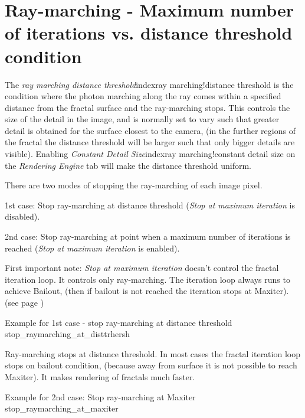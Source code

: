 \section{Ray-marching - Maximum number of iterations vs. distance threshold
	condition}\label{ray-marching---maximum-number-of-iterations-vs.-distance-threshold-condition}

The \emph{ray marching distance threshold}index{ray marching!distance threshold} is the condition where the photon
marching along the ray comes within a specified distance from the fractal
surface and the ray-marching stops. This controls the size of the detail in the
image, and is normally set to vary such that greater detail is obtained for the
surface closest to the camera, (in the further regions of the fractal the
distance threshold will be larger such that only bigger details are visible).
Enabling \emph{Constant Detail Size}index{ray marching!constant detail size} on the \emph{Rendering Engine} tab will
make the distance threshold uniform.

There are two modes of stopping the ray-marching of each image pixel.

1st case: Stop ray-marching at distance threshold (\emph{Stop at maximum
	iteration} is disabled).

2nd case: Stop ray-marching at point when a maximum number of iterations is
reached (\emph{Stop at maximum iteration} is enabled).

First important note: \emph{Stop at maximum iteration} doesn't control the
fractal iteration loop. It controls only ray-marching. The iteration loop always
runs to achieve Bailout, (then if bailout is not reached the iteration stops at
Maxiter). (see page \pageref{bailout-maxiter})

	{Example for 1st case - stop ray-marching at distance threshold}
	{stop_raymarching_at_disttrhersh}

Ray-marching stops at distance threshold. In most cases the fractal iteration
loop stops on bailout condition, (because away from surface it is not possible
to reach Maxiter). It makes rendering of fractals much faster.

	{Example for 2nd case: Stop ray-marching at Maxiter}
	{stop_raymarching_at_maxiter}

